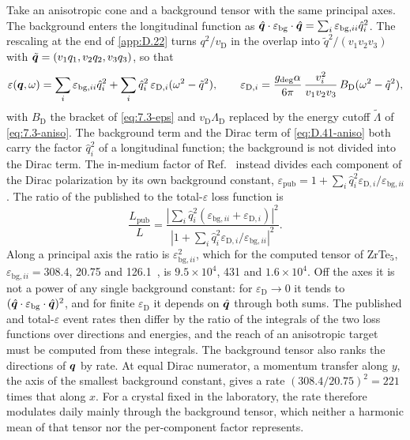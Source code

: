 Take an anisotropic cone and a background tensor with the same principal axes. The background enters the longitudinal function as $\hat{\bm{q}}\cdot\varepsilon_{\mathrm{bg}}\cdot\hat{\bm{q}} = \sum_i\varepsilon_{\mathrm{bg},ii}\hat q_i^2$. The rescaling at the end of \cref{app:D.22} turns $q^2/v_{\mathrm{D}}$ in the overlap into $\tilde q^2/(v_1v_2v_3)$ with $\tilde{\bm{q}} = (v_1q_1, v_2q_2, v_3q_3)$, so that
\begin{equation}
  \varepsilon(\bm{q},\omega) = \sum_i\varepsilon_{\mathrm{bg},ii}\hat q_i^2 + \sum_i\hat q_i^2\,\varepsilon_{\mathrm{D},i}(\omega^2 - \tilde q^2), \qquad
  \varepsilon_{\mathrm{D},i} = \frac{g_{\mathrm{deg}}\alpha}{6\pi}\,\frac{v_i^2}{v_1v_2v_3}\,B_{\mathrm{D}}(\omega^2 - \tilde q^2) ,
  \label{eq:D.41-aniso}
\end{equation}
with $B_{\mathrm{D}}$ the bracket of \cref{eq:7.3-eps} and $v_{\mathrm{D}}\Lambda_{\mathrm{D}}$ replaced by the energy cutoff $\tilde\Lambda$ of \cref{eq:7.3-aniso}. The background term and the Dirac term of \cref{eq:D.41-aniso} both carry the factor $\hat q_i^2$ of a longitudinal function; the background is not divided into the Dirac term. The in-medium factor of Ref.~\cite[Eq.~(3.14)]{geilhufe2020dirac} instead divides each component of the Dirac polarization by its own background constant, $\varepsilon_{\mathrm{pub}} = 1 + \sum_i\hat q_i^2\varepsilon_{\mathrm{D},i}/\varepsilon_{\mathrm{bg},ii}$. The ratio of the published to the total-$\varepsilon$ loss function is
\begin{equation}
  \frac{L_{\mathrm{pub}}}{L} = \frac{|\sum_i\hat q_i^2(\varepsilon_{\mathrm{bg},ii} + \varepsilon_{\mathrm{D},i})|^2}{|1 + \sum_i\hat q_i^2\varepsilon_{\mathrm{D},i}/\varepsilon_{\mathrm{bg},ii}|^2} .
  \label{eq:D.41-ratio}
\end{equation}
Along a principal axis the ratio is $\varepsilon_{\mathrm{bg},ii}^2$, which for the computed tensor of ZrTe$_5$, $\varepsilon_{\mathrm{bg},ii} = 308.4$, 20.75 and 126.1~\cite[Table~2]{geilhufe2020dirac}, is $9.5\times10^4$, 431 and $1.6\times10^4$. Off the axes it is not a power of any single background constant: for $\varepsilon_{\mathrm{D}} \to 0$ it tends to $(\hat{\bm{q}}\cdot\varepsilon_{\mathrm{bg}}\cdot\hat{\bm{q}})^2$, and for finite $\varepsilon_{\mathrm{D}}$ it depends on $\hat{\bm{q}}$ through both sums. The published and total-$\varepsilon$ event rates then differ by the ratio of the integrals of the two loss functions over directions and energies, and the reach of an anisotropic target must be computed from these integrals. The background tensor also ranks the directions of $\bm{q}$ by rate. At equal Dirac numerator, a momentum transfer along $y$, the axis of the smallest background constant, gives a rate $(308.4/20.75)^2 = 221$ times that along $x$. For a crystal fixed in the laboratory, the rate therefore modulates daily mainly through the background tensor, which neither a harmonic mean of that tensor nor the per-component factor represents.

